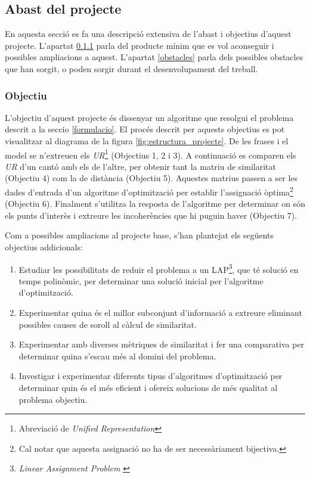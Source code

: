 \documentclass[10pt,a4paper]{article}
\begin{document}
\subsection{Abast del projecte}

En aquesta secció es fa una descripció extensiva de l'abast i objectius d'aquest projecte. L'apartat \ref{objectiu} parla del producte mínim que es vol aconseguir i possibles ampliacions a aquest. L'apartat \ref{obstacles} parla dels possibles obstacles que han sorgit, o poden sorgir durant el desenvolupament del treball.

\subsubsection{Objectiu}
\label{objectiu}

L'objectiu d'aquest projecte és dissenyar un algoritme que resolgui el problema descrit a la seccio \ref{formulacio}. El procés descrit per aquests objectius es pot visualitzar al diagrama de la figura \ref{fig:estructura_projecte}. De les frases i el model se n'extreuen els \emph{UR}\footnote{Abreviació de \emph{Unified Representation}} (Objectius 1, 2 i 3). A continuació es comparen els \emph{UR} d'un cantó amb els de l'altre, per obtenir tant la matriu de similaritat (Objectiu 4) com la de distància (Objectiu 5). Aquestes matrius passen a ser les dades d'entrada d'un algoritme d'optimització per establir l'assignació òptima\footnote{Cal notar que aquesta assignació no ha de ser necessàriament bijectiva.} (Objectiu 6). Finalment s'utilitza la resposta de l'algoritme per determinar on són els punts d'interès i extreure les incoherències que hi puguin haver (Objectiu 7).

Com a possibles ampliacions al projecte base, s'han plantejat els següents objectius addicionals:

\begin{enumerate}
    \item Estudiar les possibilitats de reduir el problema a un LAP\footnote{\emph{Linear Assignment Problem} \cite{LAP}}, que té solució en temps polinòmic, per determinar una solució inicial per l'algoritme d'optimització.
    \item Experimentar quina és el millor subconjunt d'informació a extreure eliminant possibles causes de soroll al càlcul de similaritat.
    \item Experimentar amb diverses mètriques de similaritat i fer una comparativa per determinar quina s'escau més al domini del problema.
    \item Investigar i experimentar diferents tipus d'algoritmes d'optimització per determinar quin és el més eficient i ofereix solucions de més qualitat al problema objectiu.
\end{enumerate}
\end{document}
